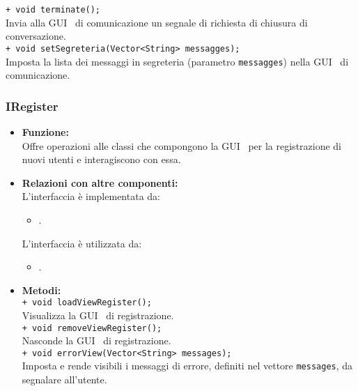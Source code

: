 {\begin{sloppypar}
{{\begin{itemize}
			\texttt{+ void terminate();}\\
			Invia alla GUI\g~ di comunicazione un segnale di richiesta di chiusura di conversazione.\\
			
			\texttt{+ void setSegreteria(Vector<String> messagges);}\\
			Imposta la lista dei messaggi in segreteria (parametro \texttt{messagges}) nella GUI\g~ di comunicazione.\\
		\end{itemize}
		}


		\subsubsection{IRegister}\label{ssub:IRegister}{
		\begin{itemize}
			\item[] \textbf{Funzione:}\\
				Offre operazioni alle classi che compongono la GUI\g~ per la registrazione di nuovi utenti e interagiscono con essa.\\
				
			\item[] \textbf{Relazioni con altre componenti:}\\
				L'interfaccia è implementata da:
				\begin{itemize}
					\item[] . 
				\end{itemize}
				L'interfaccia è utilizzata da:
				\begin{itemize}
					\item[] .\\
				\end{itemize}
				
			\item[] \textbf{Metodi:}\\
				\texttt{+ void loadViewRegister();}\\
				Visualizza la GUI\g~ di registrazione.\\
				
				\texttt{+ void removeViewRegister();}\\
				Nasconde la GUI\g~ di registrazione.\\
				
				\texttt{+ void errorView(Vector<String> messages);}\\
				Imposta e rende visibili i messaggi di errore, definiti nel vettore \texttt{messages}, da segnalare all'utente.\\
		\end{itemize}
		}
		
}
\end{sloppypar}}
